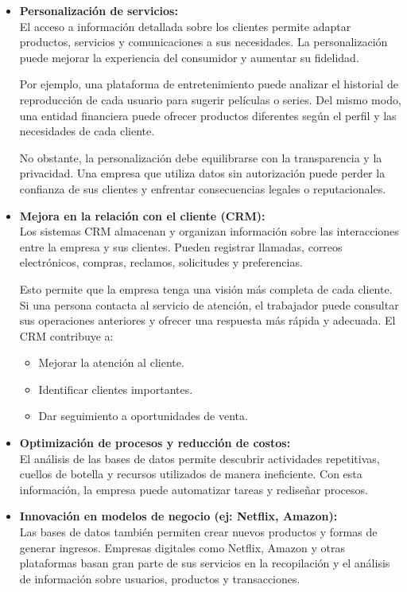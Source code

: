 \documentclass[12pt,a4paper]{article}
\begin{document}
\begin{itemize}
  \item \textbf{Personalización de servicios:} \\
  El acceso a información detallada sobre los clientes permite adaptar productos, servicios y comunicaciones a sus necesidades. La personalización puede mejorar la experiencia del consumidor y aumentar su fidelidad.

  Por ejemplo, una plataforma de entretenimiento puede analizar el historial de reproducción de cada usuario para sugerir películas o series. Del mismo modo, una entidad financiera puede ofrecer productos diferentes según el perfil y las necesidades de cada cliente.

  No obstante, la personalización debe equilibrarse con la transparencia y la privacidad. Una empresa que utiliza datos sin autorización puede perder la confianza de sus clientes y enfrentar consecuencias legales o reputacionales.

  \item \textbf{Mejora en la relación con el cliente (CRM):} \\
  Los sistemas CRM almacenan y organizan información sobre las interacciones entre la empresa y sus clientes. Pueden registrar llamadas, correos electrónicos, compras, reclamos, solicitudes y preferencias.

  Esto permite que la empresa tenga una visión más completa de cada cliente. Si una persona contacta al servicio de atención, el trabajador puede consultar sus operaciones anteriores y ofrecer una respuesta más rápida y adecuada. El CRM contribuye a:
  \begin{itemize}
    \item Mejorar la atención al cliente.
    \item Identificar clientes importantes.
    \item Dar seguimiento a oportunidades de venta.
  \end{itemize}

  \item \textbf{Optimización de procesos y reducción de costos:} \\
  El análisis de las bases de datos permite descubrir actividades repetitivas, cuellos de botella y recursos utilizados de manera ineficiente. Con esta información, la empresa puede automatizar tareas y rediseñar procesos.

  \item \textbf{Innovación en modelos de negocio (ej: Netflix, Amazon):} \\
  Las bases de datos también permiten crear nuevos productos y formas de generar ingresos. Empresas digitales como Netflix, Amazon y otras plataformas basan gran parte de sus servicios en la recopilación y el análisis de información sobre usuarios, productos y transacciones.
\end{itemize}

\clearpage
\end{document}
